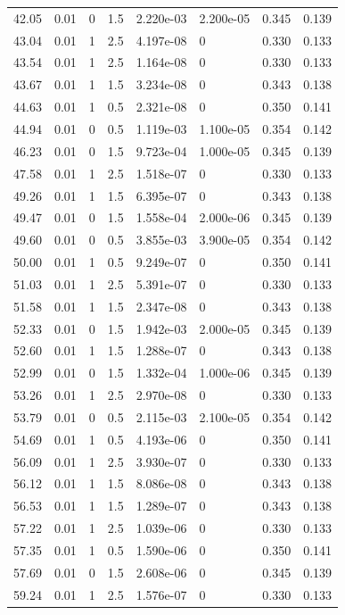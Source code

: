 \documentclass[preview]{standalone}
\begin{document}
{{{\begin{tabular}{L{1.2cm}C{1.2cm} C{0.3cm}C{0.5cm} C{1.4cm}C{1.4cm} C{1.4cm}C{1.4cm}}
  42.05  &  0.01  & 0     & 1.5 &  2.220e-03  & 2.200e-05  & 0.345 &  0.139   \\ 
  43.04  &  0.01  & 1     & 2.5 &  4.197e-08  & 0  & 0.330 &  0.133   \\ 
  43.54  &  0.01  & 1     & 2.5 &  1.164e-08  & 0  & 0.330 &  0.133   \\ 
  43.67  &  0.01  & 1     & 1.5 &  3.234e-08  & 0  & 0.343 &  0.138   \\ 
  44.63  &  0.01  & 1     & 0.5 &  2.321e-08  & 0  & 0.350 &  0.141   \\ 
  44.94  &  0.01  & 0     & 0.5 &  1.119e-03  & 1.100e-05  & 0.354 &  0.142   \\ 
  46.23  &  0.01  & 0     & 1.5 &  9.723e-04  & 1.000e-05  & 0.345 &  0.139   \\ 
  47.58  &  0.01  & 1     & 2.5 &  1.518e-07  & 0  & 0.330 &  0.133   \\ 
  49.26  &  0.01  & 1     & 1.5 &  6.395e-07  & 0  & 0.343 &  0.138   \\ 
  49.47  &  0.01  & 0     & 1.5 &  1.558e-04  & 2.000e-06  & 0.345 &  0.139   \\ 
  49.60  &  0.01  & 0     & 0.5 &  3.855e-03  & 3.900e-05  & 0.354 &  0.142   \\ 
  50.00  &  0.01  & 1     & 0.5 &  9.249e-07  & 0  & 0.350 &  0.141   \\ 
  51.03  &  0.01  & 1     & 2.5 &  5.391e-07  & 0  & 0.330 &  0.133   \\ 
  51.58  &  0.01  & 1     & 1.5 &  2.347e-08  & 0  & 0.343 &  0.138   \\ 
  52.33  &  0.01  & 0     & 1.5 &  1.942e-03  & 2.000e-05  & 0.345 &  0.139   \\ 
  52.60  &  0.01  & 1     & 1.5 &  1.288e-07  & 0  & 0.343 &  0.138   \\ 
  52.99  &  0.01  & 0     & 1.5 &  1.332e-04  & 1.000e-06  & 0.345 &  0.139   \\ 
  53.26  &  0.01  & 1     & 2.5 &  2.970e-08  & 0  & 0.330 &  0.133   \\ 
  53.79  &  0.01  & 0     & 0.5 &  2.115e-03  & 2.100e-05  & 0.354 &  0.142   \\ 
  54.69  &  0.01  & 1     & 0.5 &  4.193e-06  & 0  & 0.350 &  0.141   \\ 
  56.09  &  0.01  & 1     & 2.5 &  3.930e-07  & 0  & 0.330 &  0.133   \\ 
  56.12  &  0.01  & 1     & 1.5 &  8.086e-08  & 0  & 0.343 &  0.138   \\ 
  56.53  &  0.01  & 1     & 1.5 &  1.289e-07  & 0  & 0.343 &  0.138   \\ 
  57.22  &  0.01  & 1     & 2.5 &  1.039e-06  & 0  & 0.330 &  0.133   \\ 
  57.35  &  0.01  & 1     & 0.5 &  1.590e-06  & 0  & 0.350 &  0.141   \\ 
  57.69  &  0.01  & 0     & 1.5 &  2.608e-06  & 0  & 0.345 &  0.139   \\ 
  59.24  &  0.01  & 1     & 2.5 &  1.576e-07  & 0  & 0.330 &  0.133   \\ 
\hline 
\end{tabular} 

}}}
\end{document}
